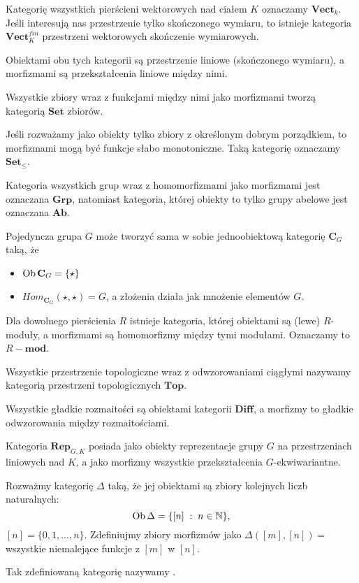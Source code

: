 \begin{example}
\item Kategorię wszystkich pierścieni wektorowych nad ciałem $K$ oznaczamy $\mathbf{Vect}_k$. Jeśli interesują nas przestrzenie tylko skończonego wymiaru, to istnieje kategoria $\mathbf{Vect}_K^{fin}$ przestrzeni wektorowych skończenie wymiarowych. 

  Obiektami obu tych kategorii są przestrzenie liniowe (skończonego wymiaru), a morfizmami są przekształcenia liniowe między nimi.

\item Wszystkie zbiory wraz z funkcjami między nimi jako morfizmami tworzą kategorią $\mathbf{Set}$ zbiorów.

\item Jeśli rozważamy jako obiekty tylko zbiory z określonym dobrym porządkiem, to morfizmami mogą być funkcje słabo monotoniczne. Taką kategorię oznaczamy $\mathbf{Set}_\leq$.

\item Kategoria wszystkich grup wraz z homomorfizmami jako morfizmami jest oznaczana $\mathbf{Grp}$, natomiast kategoria, której obiekty to tylko grupy abelowe jest oznaczana $\mathbf{Ab}$.

\item Pojedyncza grupa $G$ może tworzyć sama w sobie jednoobiektową kategorię $\mathbf{C}_G$ taką, że
  \begin{itemize}
    \item $\operatorname{Ob}\mathbf{C}_G=\{\star\}$
    \item $Hom_{\mathbf{C}_G}(\star,\star)=G$, a złożenia działa jak mnożenie elementów $G$.
    \end{itemize}

  \item Dla dowolnego pierścienia $R$ istnieje kategoria, której obiektami są (lewe) $R$-moduły, a morfizmami są homomorfizmy między tymi modułami. Oznaczamy to $R-\mathbf{mod}$.

\item Wszystkie przestrzenie topologiczne wraz z odwzorowaniami ciągłymi nazywamy kategorią przestrzeni topologicznych $\mathbf{Top}$.

\item Wszystkie gładkie rozmaitości są obiektami kategorii $\mathbf{Diff}$, a morfizmy to gładkie odwzorowania między rozmaitościami.

\item Kategoria $\mathbf{Rep}_{G,K}$ posiada jako obiekty reprezentacje grupy $G$ na przestrzeniach liniowych nad $K$, a jako morfizmy wszystkie przekształcenia $G$-ekwiwariantne.

\item Rozważmy kategorię $\Delta$ taką, że jej obiektami są zbiory kolejnych liczb naturalnych: 
  $$\operatorname{Ob}\Delta=\{[n]\;:\;n\in\operatorname{\mathbb{N}}\},$$ 
  $[n]=\{0,1,...,n\}$. Zdefiniujmy zbiory morfizmów jako $\Delta([m],[n])=$ wszystkie niemalejące funkcje z $[m]$ w $[n]$.

  Tak zdefiniowaną kategorię nazywamy .
\end{example}

